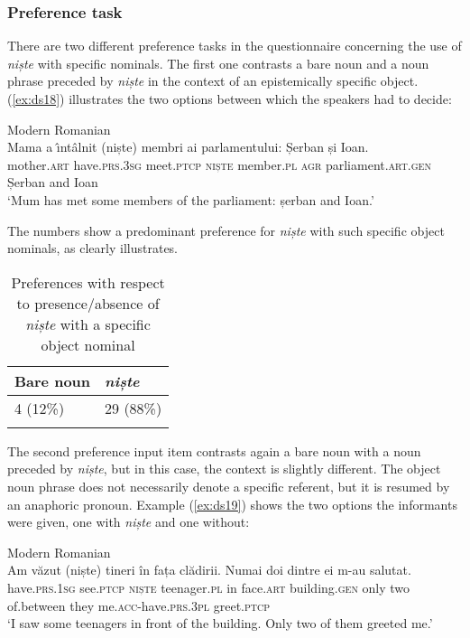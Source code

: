 \documentclass[output=paper,colorlinks,citecolor=brown]{langscibook}
\begin{document}
\subsubsection{Preference task}\label{sec:ds4.3.1}
There are two different preference tasks in the questionnaire concerning the use of \textit{niște} with specific nominals. The first one contrasts a bare noun and a noun phrase preceded by \textit{niște} in the context of an epistemically specific object. (\ref{ex:ds18}) illustrates the two options between which the speakers had to decide:

\ea\label{ex:ds18} Modern Romanian\\
\gll Mama a \^{\i}nt\^{a}lnit (niște) membri ai parlamentului: Șerban și Ioan.\\
     mother.\textsc{art} have.\textsc{prs.}3\textsc{sg} meet.\textsc{ptcp} \textsc{niște}    member.\textsc{pl} \textsc{agr} parliament.\textsc{art.gen}  Șerban and Ioan\\
\glt ‘Mum has met some members of the parliament: șerban and Ioan.’
\z

The numbers show a predominant preference for \textit{niște} with such specific object nominals, as  clearly illustrates.


\begin{table}
\begin{tabular}{ll}
\lsptoprule
Bare noun & \textit{niște}\\
\midrule
4 (12\%) & 29 (88\%)\\
\lspbottomrule
\end{tabular}
\caption{Preferences with respect to presence/absence of \textit{niște} with a specific object nominal}
\label{tab:ds2}
\end{table}

The second preference input item contrasts again a bare noun with a noun preceded by \textit{niște}, but in this case, the context is slightly different. The object noun phrase does not necessarily denote a specific referent, but it is resumed by an anaphoric pronoun. Example (\ref{ex:ds19}) shows the two options the informants were given, one with \textit{niște} and one without:

\ea\label{ex:ds19} Modern Romanian\\
\gll Am v\u{a}zut (niște) tineri \^{i}n fața cl\u{a}dirii. Numai doi  dintre ei m-au       salutat.\\
     have.\textsc{prs}.1\textsc{sg} see.\textsc{ptcp} \textsc{niște} teenager\textsc{.pl} in face.\textsc{art} building.\textsc{gen} only     two of.between they me.\textsc{acc}{}-have.\textsc{prs}.3\textsc{pl} greet.\textsc{ptcp}\\
\glt ‘I saw some teenagers in front of the building. Only two of them greeted me.’
\z
\end{document}
